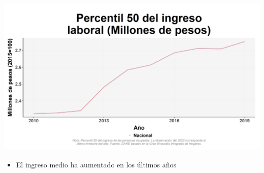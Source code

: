 \documentclass[aspectratio=169]{beamer}
\begin{document}
    \begin{slide}{3} 
                     
            \begin{imagecolumn}
                    \includegraphics[width=\columnwidth]{img/var_17_trend.png}
            \end{imagecolumn}
            \begin{textcolumn}
                \begin{itemize}
                    \item El ingreso medio ha aumentado en los últimos años
                \end{itemize}
            \end{textcolumn}

    \printcolumns
    \end{slide}
\end{document}
